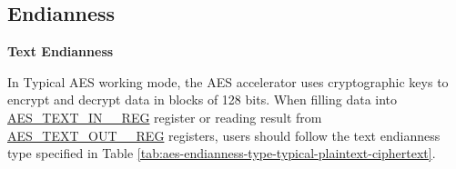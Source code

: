 \documentclass[main\_\_EN.tex]{subfiles}
\begin{document}
\subsection{Endianness}

\textbf{Text Endianness}

In Typical AES working mode, the AES accelerator uses cryptographic keys to encrypt and decrypt data in blocks of 128 bits.
When filling data into \hyperref[regdesc:AESTEXTINnREG]{AES\_TEXT\_IN\_\_REG} register or reading result from \hyperref[regdesc:AESTEXTINnREG]{AES\_TEXT\_OUT\_\_REG} registers, users should follow the text endianness type specified in Table \ref{tab:aes-endianness-type-typical-plaintext-ciphertext}.

\end{document}
